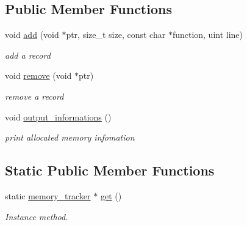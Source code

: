 \subsection*{Public Member Functions}
\begin{DoxyCompactItemize}
\item 
\mbox{\label{classminerva_1_1foundation_1_1memory__tracker_a40d5d21ff24b82be3a10809780c503ac}} 
void \hyperlink{classminerva_1_1foundation_1_1memory__tracker_a40d5d21ff24b82be3a10809780c503ac}{add} (void $\ast$ptr, size\+\_\+t size, const char $\ast$function, uint line)
\begin{DoxyCompactList}\small\item\em add a record \end{DoxyCompactList}\item 
\mbox{\label{classminerva_1_1foundation_1_1memory__tracker_ae0e9730e34188b867d82d69bcbaf5277}} 
void \hyperlink{classminerva_1_1foundation_1_1memory__tracker_ae0e9730e34188b867d82d69bcbaf5277}{remove} (void $\ast$ptr)
\begin{DoxyCompactList}\small\item\em remove a record \end{DoxyCompactList}\item 
\mbox{\label{classminerva_1_1foundation_1_1memory__tracker_afd1c76896804a25e446d7b80787b727d}} 
void \hyperlink{classminerva_1_1foundation_1_1memory__tracker_afd1c76896804a25e446d7b80787b727d}{output\+\_\+informations} ()
\begin{DoxyCompactList}\small\item\em print allocated memory infomation \end{DoxyCompactList}\end{DoxyCompactItemize}
\subsection*{Static Public Member Functions}
\begin{DoxyCompactItemize}
\item 
\mbox{\label{classminerva_1_1foundation_1_1memory__tracker_ab369ca8783692f7f349d4a023cf25fb3}} 
static \hyperlink{classminerva_1_1foundation_1_1memory__tracker}{memory\+\_\+tracker} $\ast$ \hyperlink{classminerva_1_1foundation_1_1memory__tracker_ab369ca8783692f7f349d4a023cf25fb3}{get} ()
\begin{DoxyCompactList}\small\item\em Instance method. \end{DoxyCompactList}\end{DoxyCompactItemize}

